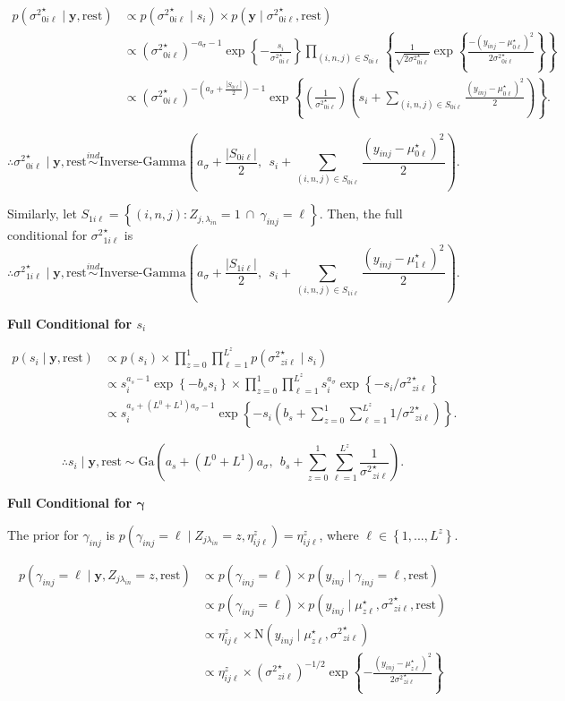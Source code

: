 \documentclass[12pt,]{article}
\newcommand{\p}[1]{\left(#1\right)}
\newcommand{\bc}[1]{ \left\{#1\right\} }
\newcommand{\abs}[1]{ \left|#1\right| }
\newcommand{\N}{ \mathcal{N} }
\newcommand{\ind}{\overset{ind}{\sim}}
\def\N{\text{N}}
\def\G{\text{Ga}}
\def\IG{\text{Inverse-Gamma}}
\def\lin{\lambda_{in}}
\def\y{\bm{y}}
\def\mus{\mu^\star}
\def\sss{{\sigma^2}^\star}
\def\rest{\text{rest}}
\begin{document}
\begin{align*}
p(\sss_{0i\ell} \mid \y, \rest) &\propto p(\sss_{0i\ell} \mid s_i) \times p(\y \mid \sss_{0i\ell}, \rest) \\
&\propto (\sss_{0i\ell})^{-a_\sigma-1} \exp\bc{-\frac{s_i}{\sss_{0i\ell}}} 
\prod_{(i,n,j)\in S_{0i\ell}} \bc{
  \frac{1}{\sqrt{2\sss_{0i\ell}}}
  \exp\bc{\frac{-(y_{inj}-\mus_{0\ell})^2}{2\sss_{0i\ell}}}
} \\
&\propto (\sss_{0i\ell})^{-(a_\sigma + \frac{\abs{S_{0i\ell}}}{2})-1}
\exp\bc{\p{\frac{1}{\sss_{0i\ell}}}\p{s_i + \sum_{(i,n,j)\in S_{0i\ell}}
\frac{(y_{inj}-\mus_{0\ell})^2}{2}
}}.
\end{align*}

\[
\therefore \sss_{0i\ell} \mid \y, \rest \ind
\IG\p{a_\sigma + \frac{\abs{S_{0i\ell}}}{2}, ~~ s_i + \sum_{(i,n,j)\in S_{0i\ell}}
\frac{(y_{inj}-\mus_{0\ell})^2}{2}
}.
\]

Similarly, let
\(S_{1i\ell} = \bc{(i, n,j): Z_{j,\lin} = 1 ~\cap~ \gamma_{inj}=\ell}\).
Then, the full conditional for \(\sss_{1i\ell}\) is \[
\therefore \sss_{1i\ell} \mid \y, \rest \ind
\IG\p{a_\sigma + \frac{\abs{S_{1i\ell}}}{2}, ~~ s_i + \sum_{(i,n,j)\in S_{1i\ell}}
\frac{(y_{inj}-\mus_{1\ell})^2}{2}
}.
\]
\vspace{2em}


\textbf{Full Conditional for $s_i$}

\begin{align*}
p(s_i \mid \y, \rest) &\propto p(s_i) \times \prod_{z=0}^1 \prod_{\ell=1}^{L^z} p(\sss_{zi\ell} \mid s_i)\\
&\propto s_i^{a_s-1} \exp\bc{-b_s s_i} \times \prod_{z=0}^1  \prod_{\ell=1}^{L^z} s_i^{a_\sigma} \exp\bc{-s_i / \sss_{zi\ell}} \\
&\propto s_i^{a_s + (L^0 + L^1)a_\sigma - 1} \exp\bc{-s_i \p{b_s + \sum_{z=0}^1 \sum_{\ell=1}^{L^z} 1 / \sss_{zi\ell}}}.
\end{align*}

\[
\therefore s_i \mid \y, \rest \sim 
\G\p{a_s + (L^0 + L^1)a_\sigma, ~~ b_s + \sum_{z=0}^1 \sum_{\ell=1}^{L^z} \frac{1}{\sss_{zi\ell}} }.
\]
\vspace{2em}


\textbf{Full Conditional for $\bm\gamma$}

The prior for \(\gamma_{inj}\) is
\(p(\gamma_{inj} = \ell \mid Z_{j\lin}=z, \eta^z_{ij\ell}) = \eta^z_{ij\ell}\),
where \(\ell \in \bc{1,...,L^z}\).

\begin{align*}
p(\gamma_{inj}=\ell \mid \y, Z_{j\lin}=z, \rest) &\propto p(\gamma_{inj}=\ell) \times p(y_{inj} \mid \gamma_{inj}=\ell, \rest) \\
&\propto p(\gamma_{inj}=\ell) \times p(y_{inj} \mid \mus_{z\ell}, \sss_{zi\ell}, \rest) \\
%
&\propto \eta^z_{ij\ell} \times \N(y_{inj} \mid \mus_{z\ell}, \sss_{zi\ell}) \\
&\propto \eta^z_{ij\ell} \times (\sss_{zi\ell})^{-1/2}
\exp\bc{-\frac{(y_{inj} - \mus_{z\ell})^2}{2\sss_{zi\ell}}} \\
\end{align*}
\end{document}
